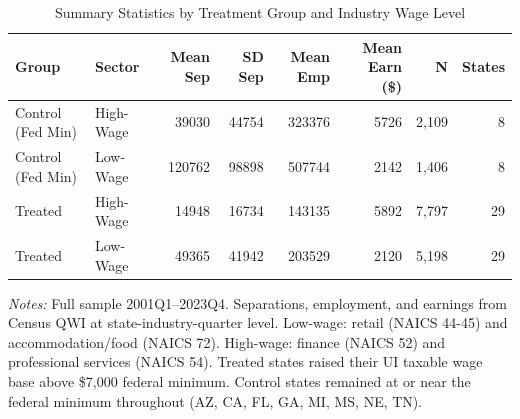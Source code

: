\begin{table}[H]
\centering
\caption{Summary Statistics by Treatment Group and Industry Wage Level}
\label{tab:summary}
\begin{threeparttable}
\footnotesize
\begin{tabular}{@{}llrrrrrr@{}}
\toprule
Group & Sector & Mean Sep & SD Sep & Mean Emp & Mean Earn (\$) & N & States \\
\midrule
Control (Fed Min) & High-Wage & 39030 & 44754 & 323376 & 5726 & 2,109 & 8 \\
Control (Fed Min) & Low-Wage & 120762 & 98898 & 507744 & 2142 & 1,406 & 8 \\
Treated & High-Wage & 14948 & 16734 & 143135 & 5892 & 7,797 & 29 \\
Treated & Low-Wage & 49365 & 41942 & 203529 & 2120 & 5,198 & 29 \\
\bottomrule
\end{tabular}
\begin{tablenotes}[flushleft]
\small
\item \textit{Notes:} Full sample 2001Q1--2023Q4. Separations, employment, and earnings from Census QWI at state-industry-quarter level. Low-wage: retail (NAICS 44-45) and accommodation/food (NAICS 72). High-wage: finance (NAICS 52) and professional services (NAICS 54). Treated states raised their UI taxable wage base above \$7,000 federal minimum. Control states remained at or near the federal minimum throughout (AZ, CA, FL, GA, MI, MS, NE, TN).
\end{tablenotes}
\end{threeparttable}
\end{table}


